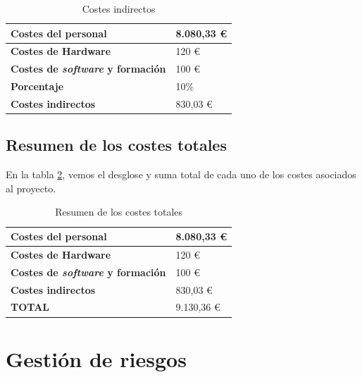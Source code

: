 \begin{table}[htpb]
\centering
\begin{tabular}{|l|l|}
\hline
\textbf{Costes del personal}            & 8.080,33 \euro \\ \hline
\textbf{Costes de Hardware}             & 120 \euro      \\ \hline
\textbf{Costes de \textit{software} y formación} & 100 \euro      \\ \hline
\textbf{Porcentaje}                     & 10\%       \\ \hline
\textbf{Costes indirectos}              & 830,03 \euro   \\ \hline
\end{tabular}
\caption{Costes indirectos}
\label{fig:coste_indirecto}
\end{table}


\subsection{Resumen de los costes totales}
En la tabla \ref{fig:coste_total}, vemos el desglose y suma total de cada uno de los costes asociados al proyecto.


\begin{table}[htpb]
\centering
\begin{tabular}{|l|l|}
\hline
\textbf{Costes del personal}            & 8.080,33 \euro \\ \hline
\textbf{Costes de Hardware}             & 120 \euro      \\ \hline
\textbf{Costes de \textit{software} y formación} & 100 \euro      \\ \hline
\textbf{Costes indirectos}              & 830,03 \euro   \\ \hline
\textbf{TOTAL}                          & 9.130,36 \euro \\ \hline
\end{tabular}
\caption{Resumen de los costes totales}
\label{fig:coste_total}
\end{table}






\section{Gestión de riesgos}

